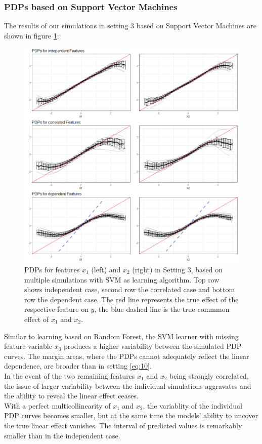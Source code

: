\documentclass[]{krantz}
\begin{document}
\subsubsection{PDPs based on Support Vector
Machines}\label{pdps-based-on-support-vector-machines-2}

The results of our simulations in setting 3 based on Support Vector
Machines are shown in figure \ref{fig:Figure21}:

\begin{figure}

\includegraphics[width=1\linewidth]{images/VK_PDP_21_Set3_SVM} \hfill{}

\caption{PDPs for features $x_1$ (left) and $x_2$  (right) in Setting 3, based on multiple simulations with SVM as learning algorithm. Top row shows independent case, second row the correlated case and bottom row the dependent case. The red line represents the true effect of the respective feature on $y$, the blue dashed line is the true commmon effect of $x_1$ and $x_2$.}\label{fig:Figure21}
\end{figure}

Similar to learning based on Random Forest, the SVM learner with missing
feature variable \(x_3\) produces a higher variability between the
simulated PDP curves. The margin areas, where the PDPs cannot adequately
reflect the linear dependence, are broader than in setting
\eqref{eq:10}.\\
In the event of the two remaining features \(x_1\) and \(x_2\) being
strongly correlated, the issue of larger variability between the
individual simulations aggravates and the ability to reveal the linear
effect ceases.\\
With a perfect multicollinearity of \(x_1\) and \(x_2\), the variablity
of the individual PDP curves becomes smaller, but at the same time the
models' ability to uncover the true linear effect vanishes. The interval
of predicted values is remarkably smaller than in the independent case.
\end{document}
